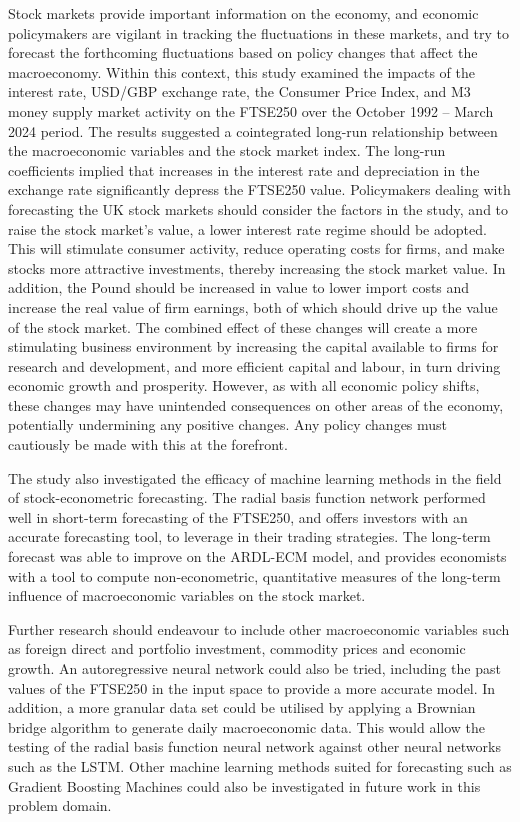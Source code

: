 \documentclass[11pt,a4paper]{article}
\begin{document}
Stock markets provide important information on the economy, 
and economic policymakers are vigilant in tracking the fluctuations 
in these markets, and try to forecast the 
forthcoming fluctuations based on policy changes that affect the macroeconomy.
Within this context, this study examined the 
impacts of the interest rate, USD/GBP
exchange rate, the Consumer Price Index, and 
M3 money supply market activity on
the FTSE250 over the October 1992 – March 2024 period.
The results suggested a cointegrated long-run
relationship between the macroeconomic variables and the stock market index. 
The long-run coefficients implied that
increases in the interest rate and depreciation in the exchange rate
significantly depress the FTSE250 value. 
Policymakers dealing with forecasting the UK stock markets
should consider the factors in the study, and to raise the stock
market's value, a lower interest rate regime should be adopted. This will 
stimulate consumer activity, reduce operating costs for firms, and make 
stocks more attractive investments, thereby increasing the stock market value. 
In addition, the Pound should be increased in value to lower import costs 
and increase the real value of firm earnings, both of which should drive up 
the value of the stock market. The combined effect of these changes will 
create a more stimulating business environment by increasing the capital 
available to firms for research and development, and more efficient 
capital and labour, in turn 
driving economic growth and prosperity. However, 
as with all economic policy shifts, these changes may have 
unintended consequences on other areas of the economy, potentially 
undermining any positive changes. Any policy changes must cautiously be made 
with this at the forefront.


The study also investigated the efficacy of machine learning methods in 
the field of stock-econometric forecasting. The radial basis function network performed well in
short-term forecasting of the FTSE250, and offers investors with an accurate forecasting tool, 
to leverage in their trading strategies. The long-term forecast was able to improve on the ARDL-ECM model, and provides 
economists with a tool to compute non-econometric, quantitative measures of the 
long-term influence of macroeconomic variables on the stock market. 

Further research should endeavour to include other macroeconomic variables such as 
foreign direct and portfolio investment, commodity prices and economic growth.
An autoregressive neural network could also be tried, including the past values of the 
FTSE250 in the input space to provide a more accurate model. In addition, 
a more granular data set could be utilised by applying a 
Brownian bridge algorithm to generate daily macroeconomic data. This would allow 
the testing of the radial basis function neural network against other neural networks 
such as the LSTM. Other machine learning methods suited for 
forecasting such as Gradient Boosting Machines could 
also be investigated in future work in this problem domain. 
\end{document}

